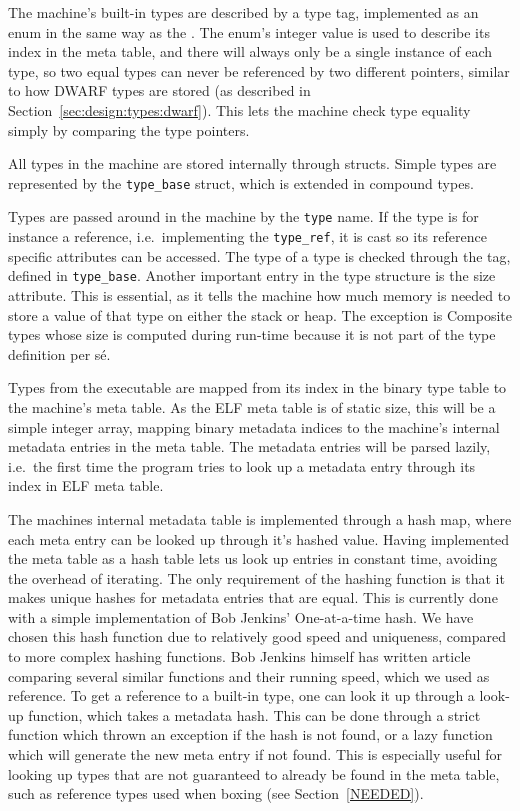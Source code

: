 The machine's built-in types are described by a type tag, implemented as an enum
in the same way as the . The enum's integer value is used to
describe its index in the meta table, and there will always only be a single
instance of each type, so two equal types can never be referenced by two
different pointers, similar to how DWARF types are stored (as described in
Section~\ref{sec:design:types:dwarf}). This lets the machine check type equality
simply by comparing the type pointers.

All types in the machine are stored internally through structs. Simple types are
represented by the {\tt type\_base} struct, which is extended in compound
types.

Types are passed around in the machine by the {\tt type} name. If the type is
for instance a reference, i.e.~implementing the {\tt type\_ref}, it is cast so
its reference specific attributes can be accessed. The type of a type is checked
through the tag, defined in {\tt type\_base}. Another important entry in the
type structure is the size attribute. This is essential, as it tells the machine
how much memory is needed to store a value of that type on either the stack or
heap. The exception is Composite types whose size is computed during run-time
because it is not part of the type definition per s\'e.

Types from the executable are mapped from its index in the binary type table to
the machine's meta table. As the ELF meta table is of static size, this will be
a simple integer array, mapping binary metadata indices to the machine's
internal metadata entries in the meta table. The metadata entries will be parsed
lazily, i.e.~the first time the program tries to look up a metadata entry
through its index in ELF meta table.

The machines internal metadata table is implemented through a hash map, where
each meta entry can be looked up through it's hashed value. Having implemented
the meta table as a hash table lets us look up entries in constant time,
avoiding the overhead of iterating. The only requirement of the hashing function
is that it makes unique hashes for metadata entries that are equal. This is
currently done with a simple implementation of Bob Jenkins' One-at-a-time
hash\cite{jenkins}. We have chosen this hash function due to relatively good
speed and uniqueness, compared to more complex hashing functions. Bob Jenkins
himself has written article comparing several similar functions and their
running speed, which we used as reference\cite{jenkins}. To get a reference to a
built-in type, one can look it up through a look-up function, which takes a
metadata hash. This can be done through a strict function which thrown an
exception if the hash is not found, or a lazy function which will generate the
new meta entry if not found. This is especially useful for looking up types that
are not guaranteed to already be found in the meta table, such as reference
types used when boxing (see Section~\ref{NEEDED}).

